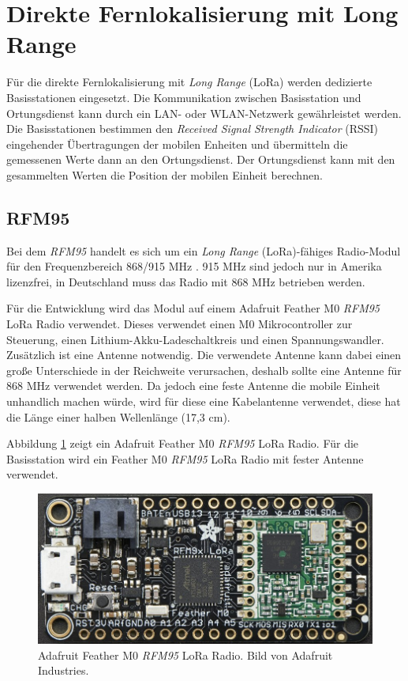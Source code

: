 \section{Direkte Fernlokalisierung mit Long Range}
\label{ch:phase4}
Für die direkte Fernlokalisierung mit \emph{Long Range} (LoRa) werden dedizierte Basisstationen eingesetzt. 
Die Kommunikation zwischen Basisstation und Ortungsdienst kann durch ein LAN- oder WLAN-Netzwerk gewährleistet werden.
Die Basisstationen bestimmen den \emph{Received Signal Strength Indicator} (RSSI) eingehender Übertragungen der mobilen Enheiten und übermitteln die gemessenen Werte dann an den Ortungsdienst.
Der Ortungsdienst kann mit den gesammelten Werten die Position der mobilen Einheit berechnen.

\subsection{RFM95}
\label{ch:hardwarechanges:sec:rfm95}
Bei dem \emph{RFM95} handelt es sich um ein \emph{Long Range} (LoRa)-fähiges Radio-Modul für den Frequenzbereich 868/915 MHz \cite{hope2006rfm}. 
915 MHz sind jedoch nur in Amerika lizenzfrei, in Deutschland muss das Radio mit 868 MHz betrieben werden.

Für die Entwicklung wird das Modul auf einem Adafruit Feather M0 \emph{RFM95} LoRa Radio verwendet.
Dieses verwendet einen M0 Mikrocontroller zur Steuerung, einen Lithium-Akku-Ladeschaltkreis und einen Spannungswandler.
Zusätzlich ist eine Antenne notwendig. 
Die verwendete Antenne kann dabei einen große Unterschiede in der Reichweite verursachen, deshalb sollte eine Antenne für 868 MHz verwendet werden.
Da jedoch eine feste Antenne die mobile Einheit unhandlich machen würde, wird für diese eine Kabelantenne verwendet, diese hat die Länge einer halben Wellenlänge (17,3 cm).

Abbildung \ref{fig:lorafeather} zeigt ein Adafruit Feather M0 \emph{RFM95} LoRa Radio. 
Für die Basisstation wird ein Feather M0 \emph{RFM95} LoRa Radio mit fester Antenne verwendet.

\begin{figure}[h]
  \centering
	\includegraphics[width=\textwidth]{images/loraada.png}
  \caption{Adafruit Feather M0 \emph{RFM95} LoRa Radio. Bild von Adafruit Industries\protect \footnotemark.}
  \label{fig:lorafeather}
\end{figure}

